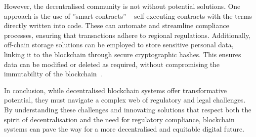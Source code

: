 However, the decentralised community is not without potential solutions. One approach is the use of ''smart contracts'' – self-executing contracts with the terms directly written into code. These can automate and streamline compliance processes, ensuring that transactions adhere to regional regulations. Additionally, off-chain storage solutions can be employed to store sensitive personal data, linking it to the blockchain through secure cryptographic hashes. This ensures data can be modified or deleted as required, without compromising the immutability of the blockchain~\cite{Schwerin.2018}.

In conclusion, while decentralised blockchain systems offer transformative potential, they must navigate a complex web of regulatory and legal challenges. By understanding these challenges and innovating solutions that respect both the spirit of decentralisation and the need for regulatory compliance, blockchain systems can pave the way for a more decentralised and equitable digital future.

